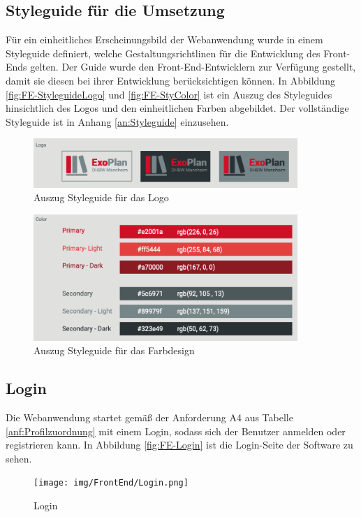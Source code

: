 \subsection{Styleguide für die Umsetzung}
Für ein einheitliches Erscheinungsbild der Webanwendung wurde in einem Styleguide definiert, welche Gestaltungsrichtlinen für die Entwicklung des Front-Ends gelten. 
Der Guide wurde den Front-End-Entwicklern zur Verfügung gestellt, damit 
sie diesen bei ihrer Entwicklung berücksichtigen können. 
In Abbildung \vref{fig:FE-StyleguideLogo} und \vref{fig:FE-StyColor} ist ein Auszug des Styleguides hinsichtlich des Logos und den einheitlichen Farben abgebildet.
Der vollständige Styleguide ist in Anhang \vref{an:Styleguide} einzusehen.
\begin{figure}[H]
	\centering 
	\includegraphics[width=10cm]{img/FrontEnd/StyLogo.png}
	\caption[Auszug Styleguide für das Logo]{\label{fig:FE-StyleguideLogo}Auszug Styleguide für das Logo}
\end{figure}

\begin{figure}[H]
	\centering 
	\includegraphics[width=10cm]{img/FrontEnd/StyColor.png}
	\caption[Auszug Styleguide für das Farbdesign]{\label{fig:FE-StyColor}Auszug Styleguide für das Farbdesign}
\end{figure}

\newpage
\subsection{Login}
Die Webanwendung startet gemäß der Anforderung A4 aus Tabelle \vref{anf:Profilzuordnung} mit einem Login, sodass sich der Benutzer anmelden oder registrieren kann. 
In Abbildung \vref{fig:FE-Login} ist die Login-Seite der Software zu sehen.
\begin{figure}[H]
	\centering 
	\texttt{[image: img/FrontEnd/Login.png]}
	\caption[Login]{\label{fig:FE-Login}Login}
\end{figure}

